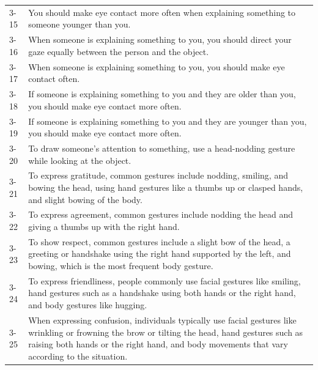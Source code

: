 \documentclass{CSSRforAfrica}
\begin{document}
\begin{table}[H]
\begin{center}
\begin{tabularx}{\linewidth}{|l|X|}
{\small 3-15 }  & {\small You should make eye contact more often when explaining something to someone younger than you.}\\

{\small 3-16 }  & {\small When someone is explaining something to you, you should direct your gaze equally between the person and the object.}\\

{\small 3-17 } & {\small When someone is explaining something to you, you should make eye contact often.}\\

{\small 3-18 } & {\small If someone is explaining something to you and they are older than you, you should make eye contact more often.}\\

{\small 3-19 } & {\small If someone is explaining something to you and they are younger than you, you should make eye contact more often.}\\

{\small 3-20 } & {\small To draw someone's attention to something, use a head-nodding gesture while looking at the object.}\\

{\small 3-21 } & {\small To express gratitude, common gestures include nodding, smiling, and bowing the head, using hand gestures like a thumbs up or clasped hands, and slight bowing of the body.}\\

{\small 3-22 } & {\small To express agreement, common gestures include nodding the head and giving a thumbs up with the right hand.}\\

{\small 3-23 } & {\small To show respect, common gestures include a slight bow of the head, a greeting or handshake using the right hand supported by the left, and bowing, which is the most frequent body gesture.}\\

{\small 3-24 } & {\small To express friendliness, people commonly use facial gestures like smiling, hand gestures such as a handshake using both hands or the right hand, and body gestures like hugging.}\\

{\small 3-25 } & {\small When expressing confusion, individuals typically use facial gestures like wrinkling or frowning the brow or tilting the head, hand gestures such as raising both hands or the right hand, and body movements that vary according to the situation.}\\


\end{tabularx}
\end{center}
\end{table}
\end{document}
